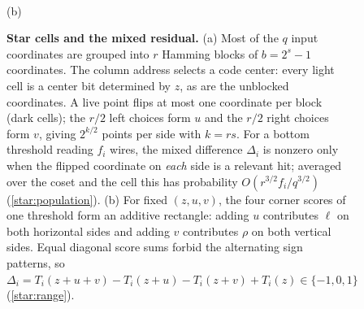 \documentclass[11pt,letterpaper]{article}
\theoremstyle{definition}
\theoremstyle{remark}
\begin{document}
\begin{figure}[t]
\begin{minipage}[b]{0.335\textwidth}
\\[2pt]
{\footnotesize (b)}
\end{minipage}
\caption{\textbf{Star cells and the mixed residual.}
(a) Most of the $q$ input coordinates are grouped into $r$ Hamming
blocks of $b=2^s{-}1$ coordinates. The column address selects a code
center: every light cell is a center bit determined by $z$, as are the
unblocked coordinates. A live point flips at most one coordinate per
block (dark cells); the $r/2$ left choices form $u$ and the $r/2$
right choices form $v$, giving $2^{k/2}$ points per side with $k=rs$.
For a bottom threshold reading $f_i$ wires, the mixed difference
$\Delta_i$ is nonzero only when the flipped coordinate on \emph{each}
side is a relevant hit; averaged over the coset and the cell this has
probability $O(r^{3/2}f_i/q^{3/2})$ (\cref{star:population}).
(b) For fixed $(z,u,v)$, the four corner scores of one threshold form
an additive rectangle: adding $u$ contributes $\ell$ on both horizontal
sides and adding $v$ contributes $\rho$ on both vertical sides. Equal
diagonal score sums forbid the alternating sign patterns, so
$\Delta_i=T_i(z{+}u{+}v)-T_i(z{+}u)-T_i(z{+}v)+T_i(z)\in\{-1,0,1\}$
(\cref{star:range}).}
\label{fig:stars}
\end{figure}
\end{document}
